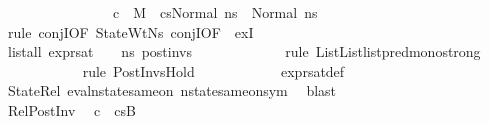 \begin{isabellebody}
\ \ \ \ \ \ \ \ \ \ \ \ \ \ \ {\isacharparenleft}{\kern0pt}{\isasymnot}\ c\ {\isasymlongrightarrow}\ M{\isacharcomma}{\kern0pt}{\isasymLambda}{\isacharcomma}{\kern0pt}{\isasymGamma}{\isacharcomma}{\kern0pt}{\isasymOmega}\ {\isasymturnstile}\ {\isasymlangle}cs{}{\isacharcomma}{\kern0pt}Normal\ ns{}{\isasymrangle}\ {\isacharbrackleft}{\kern0pt}{\isasymrightarrow}{\isacharbrackright}{\kern0pt}\ Normal\ ns{}{\isacharprime}{\kern0pt}{\isacharparenright}{\kern0pt}{\isacharparenright}{\kern0pt}{\isacharparenright}{\kern0pt}{\isachardoublequoteclose}\isanewline
\ \ \ \ \ \ \isamarkupfalse%
\ {\isacharparenleft}{\kern0pt}rule\ conjI{\isacharbrackleft}{\kern0pt}OF\ StateWtNs{\isacharprime}{\kern0pt}\ conjI{\isacharbrackleft}{\kern0pt}OF\ {\isacharunderscore}{\kern0pt}\ exI{\isacharbrackright}{\kern0pt}{\isacharbrackright}{\kern0pt}{\isacharparenright}{\kern0pt}\isanewline
\ \ \ \ \ \ \ \ \isamarkupfalse%
\ {\isachardoublequoteopen}list{\isacharunderscore}{\kern0pt}all\ {\isacharparenleft}{\kern0pt}expr{\isacharunderscore}{\kern0pt}sat\ {\isasymLambda}\ {\isasymGamma}\ {\isasymOmega}\ ns{\isacharprime}{\kern0pt}{\isacharparenright}{\kern0pt}\ post{\isacharunderscore}{\kern0pt}invs{\isachardoublequoteclose}\ \isanewline
\ \ \ \ \ \ \ \ \ \ \isamarkupfalse%
\ {\isacharparenleft}{\kern0pt}rule\ List{\isachardot}{\kern0pt}List{\isachardot}{\kern0pt}list{\isachardot}{\kern0pt}pred{\isacharunderscore}{\kern0pt}mono{\isacharunderscore}{\kern0pt}strong{\isacharparenright}{\kern0pt}\isanewline
\ \ \ \ \ \ \ \ \ \ \isamarkupfalse%
\ {\isacharparenleft}{\kern0pt}rule\ PostInvsHold{\isacharparenright}{\kern0pt}\isanewline
\ \ \ \ \ \ \ \ \ \ \isamarkupfalse%
\ expr{\isacharunderscore}{\kern0pt}sat{\isacharunderscore}{\kern0pt}def\isanewline
\ \ \ \ \ \ \ \ \ \ \isamarkupfalse%
\ StateRel{}\ eval{\isacharunderscore}{\kern0pt}nstate{\isacharunderscore}{\kern0pt}same{\isacharunderscore}{\kern0pt}on{\isacharparenleft}{\kern0pt}{}{\isacharparenright}{\kern0pt}\ nstate{\isacharunderscore}{\kern0pt}same{\isacharunderscore}{\kern0pt}on{\isacharunderscore}{\kern0pt}sym\ \isamarkupfalse%
\ blast\isanewline
\ \ \ \ \ \ \isamarkupfalse%
\isanewline
\ \ \ \ \ \ \ \ \isamarkupfalse%
\ RelPostInv\ \isamarkupfalse%
\ {\isachardoublequoteopen}{\isasymnot}c\ {\isasymLongrightarrow}\ cs{}B{\isacharprime}{\kern0pt}{\isacharprime}{\kern0pt}{\isacharprime}{\kern0pt}\ {\isacharequal}{\kern0pt}\ {\isacharbrackleft}{\kern0pt}{\isacharbrackright}{\kern0pt}{\isachardoublequoteclose}\isanewline

\end{isabellebody}
